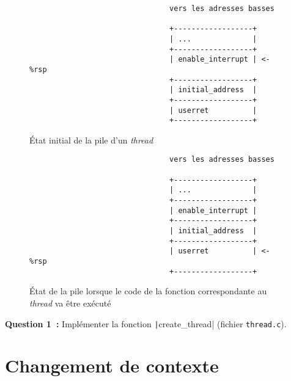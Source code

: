 \documentclass[a4paper]{article}
\begin{document}
\begin{figure}[!htpb]
\begin{center}
\begin{verbatim}
                                vers les adresses basses

                                +------------------+
                                | ...              |
                                +------------------+
                                | enable_interrupt | <- %rsp
                                +------------------+
                                | initial_address  |
                                +------------------+
                                | userret          |
                                +------------------+
\end{verbatim}
\caption{\'Etat initial de la pile d'un \emph{thread}}
\label{fig:stack}
\end{center}
\end{figure}

\begin{figure}[!htpb]
\begin{center}
\begin{verbatim}
                                vers les adresses basses

                                +------------------+
                                | ...              |
                                +------------------+
                                | enable_interrupt |
                                +------------------+
                                | initial_address  | 
                                +------------------+
                                | userret          | <- %rsp
                                +------------------+
\end{verbatim}
\caption{\'Etat de la pile lorsque le code de la fonction correspondante au \emph{thread} va être exécuté}
\label{fig:stack2}
\end{center}
\end{figure}

\textbf{Question 1~:} Implémenter la fonction \texttt|create_thread| (fichier \verb+thread.c+).\\

\section{Changement de contexte}
\end{document}
